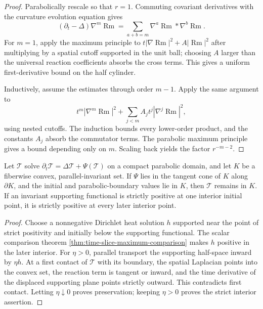 \begin{proof}
Parabolically rescale so that $r=1$.  Commuting covariant derivatives with
the curvature evolution equation gives
\[
 (\partial_t-\Delta)\nabla^m\operatorname{Rm}
 =\sum_{a+b=m}\nabla^a\operatorname{Rm}*\nabla^b\operatorname{Rm}.
\]
For $m=1$, apply the maximum principle to
$t|\nabla\operatorname{Rm}|^2+A|\operatorname{Rm}|^2$ after multiplying by
a spatial cutoff supported in the unit ball; choosing $A$ larger than the
universal reaction coefficients absorbs the cross terms.  This gives a
uniform first-derivative bound on the half cylinder.

Inductively, assume the estimates through order $m-1$.  Apply the same
argument to
\[
 t^m|\nabla^m\operatorname{Rm}|^2
 +\sum_{j<m}A_jt^j|\nabla^j\operatorname{Rm}|^2,
\]
using nested cutoffs.  The induction bounds every lower-order product, and
the constants $A_j$ absorb the commutator terms.  The parabolic maximum
principle gives a bound depending only on $m$.  Scaling back yields the
factor $r^{-m-2}$.
\end{proof}

\begin{theorem}
\label{thm:strong-curvature-tensor-maximum-principle}
\notready
Let $\mathcal T$ solve
$\partial_t\mathcal T=\Delta\mathcal T+\Psi(\mathcal T)$ on a compact
parabolic domain, and let $K$ be a fiberwise convex, parallel-invariant set.
If $\Psi$ lies in the tangent cone of $K$ along $\partial K$, and the initial
and parabolic-boundary values lie in $K$, then $\mathcal T$ remains in $K$.
If an invariant supporting functional is strictly positive at one interior
initial point, it is strictly positive at every later interior point.
\end{theorem}

\begin{proof}
Choose a nonnegative Dirichlet heat solution $h$ supported near the point of
strict positivity and initially below the supporting functional.  The scalar
comparison theorem \ref{thm:time-slice-maximum-comparison} makes $h$ positive
in the later interior.  For $\eta>0$, parallel transport the supporting
half-space inward by $\eta h$.  At a first contact of $\mathcal T$ with its
boundary, the spatial Laplacian points into the convex set, the reaction term
is tangent or inward, and the time derivative of the displaced supporting
plane points strictly outward.  This contradicts first contact.  Letting
$\eta\downarrow0$ proves preservation; keeping $\eta>0$ proves the strict
interior assertion.
\end{proof}

